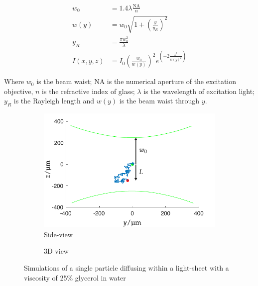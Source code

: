 \begin{align}
  w_0 &= 1.4 \lambda \frac{ \text{NA}}{n}\\
  w(y) &= w_0 \sqrt{1+\left(\frac{y}{y_R}\right)^2}\\
  y_R &= \frac{\pi w_0^2}{\lambda}\\
  I(x,y,z) &= I_0 \left(\frac{w_0}{w(y)}\right)^2 e^{\left(-2\frac{z^2}{w(y)^2}\right)}
\end{align}

Where $w_0$ is the beam waist; NA is the numerical aperture of the excitation objective, $n$ is the refractive index of glass; $\lambda$ is the wavelength of excitation light; $y_R$ is the Rayleigh length and $w(y)$ is the beam waist through $y$.



\begin{figure}
  \centering
  \begin{subfigure}[t]{0.8\linewidth}
    \centering
    \includegraphics{./simulation/size_view_diffusion}
    \caption{Side-view}
    \label{fig:size_view_diffusion}
  \end{subfigure}
  \begin{subfigure}[t]{0.8\linewidth}
    \centering
    \caption{3D view}
    \label{fig:diffusion_3d}
  \end{subfigure}
  \caption{Simulations of a single particle diffusing within a light-sheet with a viscosity of 25\% glycerol in water}
  \label{fig:diffusion}
\end{figure}

